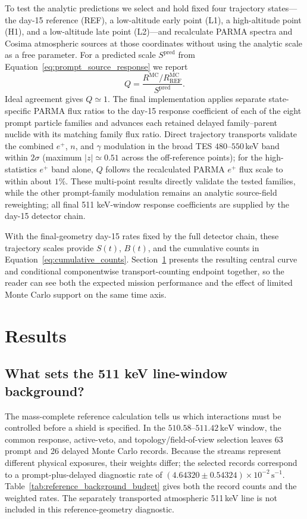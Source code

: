\documentclass[11pt]{article}
\newcommand{\keV}{\ensuremath{\,\mathrm{keV}}}
\newcommand{\cps}{\ensuremath{\,\mathrm{s^{-1}}}}
\begin{document}
To test the analytic predictions we select and hold fixed four trajectory
states---the day-15 reference (REF), a low-altitude early point (L1), a
high-altitude point (H1), and a low-altitude late point (L2)---and recalculate
PARMA spectra and Cosima atmospheric sources at those coordinates without using
the analytic scale as a free parameter. For a predicted scale $S^{\mathrm{pred}}$
from Equation~\eqref{eq:prompt_source_response} we report
\begin{equation}
  Q=\frac{R^{\mathrm{MC}}/R^{\mathrm{MC}}_{\mathrm{REF}}}{S^{\mathrm{pred}}}.
\end{equation}
Ideal agreement gives $Q\simeq1$. The final implementation applies separate
state-specific PARMA flux ratios to the day-15 response coefficient of each of the eight
prompt particle families and advances each retained delayed family--parent
nuclide with its matching family flux ratio. Direct trajectory transports validate the combined $e^+$,
$n$, and $\gamma$ modulation in the broad TES $480$--$550$\,keV band within
$2\sigma$ (maximum $|z|\simeq0.51$ across the off-reference points); for the
high-statistics $e^+$ band alone, $Q$ follows the recalculated PARMA $e^+$ flux
scale to within about $1\%$. These multi-point results directly validate the tested families,
while the other prompt-family modulation remains an analytic source-field
reweighting; all final 511 keV-window response coefficients are supplied by the
day-15 detector chain.

With the final-geometry day-15 rates fixed by the full detector chain, these trajectory
scales provide $S(t)$, $B(t)$, and the cumulative counts in
Equation~\eqref{eq:cumulative_counts}. Section~\ref{sec:results} presents the
resulting central curve and conditional componentwise transport-counting endpoint together, so
the reader can see both the expected mission performance and the effect of limited
Monte Carlo support on the same time axis.


\section{Results}
\label{sec:results}

\subsection{What sets the 511 keV line-window background?}
\label{subsec:reference_background_results}

The mass-complete reference calculation tells us which interactions must be
controlled before a shield is specified. In the $510.58$--$511.42\keV$ window,
the common response, active-veto, and topology/field-of-view selection leaves 63 prompt and
26 delayed Monte Carlo records. Because the streams represent different physical
exposures, their weights differ; the selected records correspond to a
prompt-plus-delayed diagnostic rate of
$(4.64320\pm0.54324)\times10^{-2}\cps$. Table~\ref{tab:reference_background_budget}
gives both the record counts and the weighted rates. The separately transported
atmospheric 511\,keV line is not included in this reference-geometry diagnostic.
\end{document}
